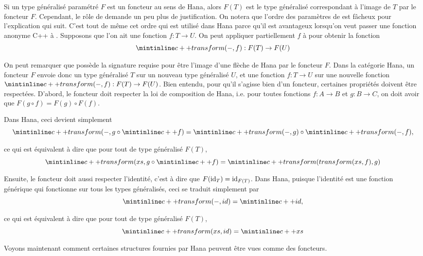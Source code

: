 Si un type généralisé paramétré $F$ est un foncteur au sens de Hana, alors
$F(T)$ est le type généralisé correspondant à l'image de $T$ par le foncteur
$F$. Cependant, le rôle de  demande un peu plus de
justification. On notera que l'ordre des paramètres de  est
fâcheux pour l'explication qui suit. C'est tout de même cet ordre qui est
utilisé dans Hana parce qu'il est avantageux lorsqu'on veut passer une
fonction anonyme C++ à . Supposons que l'on ait une fonction
$f : T \to U$. On peut appliquer partiellement $f$ à  pour
obtenir la fonction
\[
    \icpp{transform(-, f)} : F(T) \to F(U)
\]

On peut remarquer que  possède la signature requise
pour être l'image d'une flèche de Hana par le foncteur $F$. Dans la catégorie
Hana, un foncteur $F$ envoie donc un type généralisé $T$ sur un nouveau type
généralisé $U$, et une fonction $f : T \to U$ sur une nouvelle fonction
$\icpp{transform(-, f)} : F(T) \to F(U)$. Bien entendu, pour qu'il s'agisse
bien d'un foncteur, certaines propriétés doivent être respectées. D'abord,
le foncteur doit respecter la loi de composition de Hana, i.e. pour toutes
fonctions $f : A \to B$ et $g : B \to C$, on doit avoir que
$F(g \circ f) = F(g) \circ F(f)$.

Dans Hana, ceci devient simplement
\[
    \icpp{transform(-, g} \circ \icpp{f)} = \icpp{transform(-, g)} \circ \icpp{transform(-, f)},
\]

ce qui est équivalent à dire que pour tout  de type généralisé $F(T)$,
\[
    \icpp{transform(xs, g} \circ \icpp{f)} = \icpp{transform(transform(xs, f), g)}
\]

Ensuite, le foncteur doit aussi respecter l'identité, c'est à dire que
$F(\mathrm{id}_T) = \mathrm{id}_{F(T)}$. Dans Hana, puisque l'identité est une fonction
générique qui fonctionne sur tous les types généralisés, ceci se traduit
simplement par
\[
    \icpp{transform(-, id)} = \icpp{id},
\]

ce qui est équivalent à dire que pour tout  de type généralisé $F(T)$,
\[
    \icpp{transform(xs, id)} = \icpp{xs}
\]

Voyons maintenant comment certaines structures fournies par Hana peuvent
être vues comme des foncteurs.


